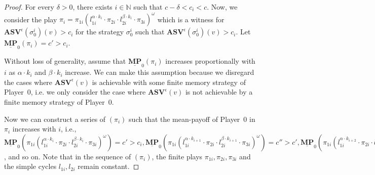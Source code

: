 \begin{proof}
    For every $\delta > 0$, there exists $i \in \mathbb{N}$ such that $c - \delta < c_i < c$. Now, we consider the play $\pi_i = \pi_{1i}(l^{\alpha \cdot k_i}_{1i} \cdot \pi_{2i} \cdot l^{\beta \cdot k_i}_{2i} \cdot \pi_{3i})^{\omega}$ which is a witness for $ \mathbf{ASV}^{\epsilon}(\sigma_0^i)(v) > c_i$ for the strategy $\sigma_0^i$ such that $\mathbf{ASV}^{\epsilon} (\sigma_0^i)(v) > c_i$. Let $\underline{\mathbf{MP}}_0(\pi_i)= c' > c_i$. 

    Without loss of generality, assume that $\underline{\mathbf{MP}}_0(\pi_i)$ increases proportionally with $i$ as $\alpha \cdot k_i$ and $\beta \cdot k_i$ increase. We can make this assumption because we disregard the cases where $\mathbf{ASV}^{\epsilon}(v)$ is achievable with some finite memory strategy of Player~0, i.e. we only consider the case where $\mathbf{ASV}^{\epsilon}(v)$ is not achievable by a finite memory strategy of Player~0.

    Now we can construct a series of $(\pi_i)$ such that the  mean-payoff of Player~0 in $\pi_i$ increases with $i$, i.e., $\underline{\mathbf{MP}}_0(\pi_{1i}(l^{\alpha \cdot k_i}_{1i} \cdot \pi_{2i} \cdot l^{\beta \cdot k_i}_{2i} \cdot \pi_{3i})^{\omega}) = c' > c_i, \underline{\mathbf{MP}}_0(\pi_{1i}(l^{\alpha \cdot k_{i+1}}_{1i} \cdot \pi_{2i} \cdot l^{\beta \cdot k_{i+1}}_{2i} \cdot \pi_{3i})^{\omega}) = c'' > c', \underline{\mathbf{MP}}_0(\pi_{1i}(l^{\alpha \cdot k_{i+2}}_{1i} \cdot \pi_{2i} \cdot l^{\beta \cdot k_{i+2}}_{2i} \cdot \pi_{3i})^{\omega}) = c''' > c''$, and so on. Note that in the sequence of $(\pi_i)$, the finite plays $\pi_{1i}, \pi_{2i}, \pi_{3i}$ and the simple cycles $l_{1i}, l_{2i}$ remain constant.


\end{proof}
